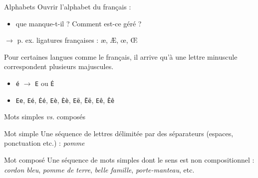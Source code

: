 \documentclass[xetex,xcolor={table,usenames,dvipsnames}]{beamer}
\begin{document}
\begin{frame}{Alphabets}
		Ouvrir l'alphabet du français :
	\begin{itemize}
		\item que manque-t-il ? Comment est-ce géré ?
	\end{itemize}
	
	$\rightarrow$ p. ex. ligatures françaises : \ae{}, \AE{}, \oe{}, \OE{}
	
	Pour certaines langues comme le français, il arrive qu’à une lettre minuscule correspondent plusieurs majuscules.
	\begin{itemize}
		\item \texttt{é} $\rightarrow$ \texttt{E} ou \texttt{É}
		\item[] \texttt{Ee}, \texttt{Eé}, \texttt{Éé}, \texttt{Eè}, \texttt{Èè}, \texttt{Eë}, \texttt{Ëë}, \texttt{Eê}, \texttt{Êê}
	\end{itemize}
\end{frame}



\begin{frame}{Mots simples \textit{vs.} composés}
	\begin{block}{Mot simple}
		Une séquence de lettres délimitée par des séparateurs (espaces, ponctuation etc.) : \textit{pomme}
	\end{block}
	
		\begin{block}{Mot composé}
		Une séquence de mots simples dont le sens est non compositionnel : \textit{cordon bleu}, \textit{pomme de terre}, \textit{belle famille}, \textit{porte-manteau}, etc.
	\end{block}
\end{frame}
\end{document}
